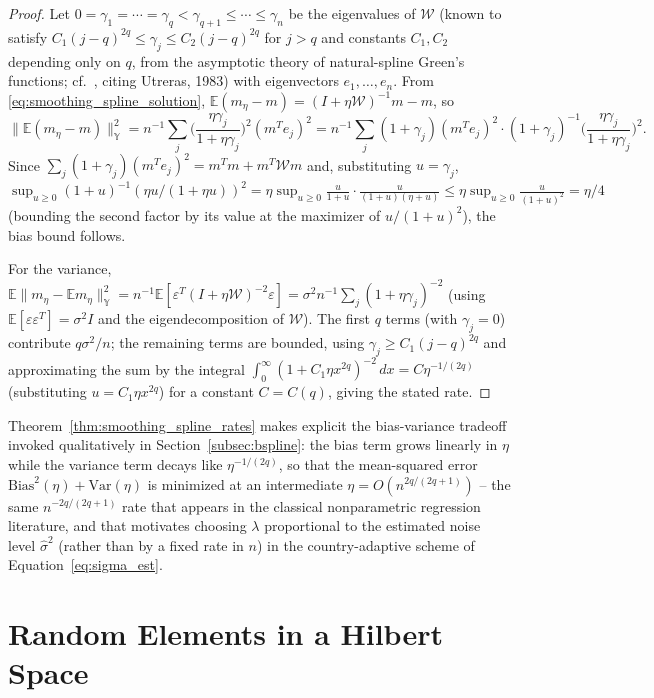 \begin{proof}
Let $0=\gamma_1=\cdots=\gamma_q<\gamma_{q+1}\leq\cdots\leq\gamma_n$ be the
eigenvalues of $\mathcal{W}$ (known to satisfy $C_1(j-q)^{2q}\leq\gamma_j
\leq C_2(j-q)^{2q}$ for $j>q$ and constants $C_1,C_2$ depending only on
$q$, from the asymptotic theory of natural-spline Green's functions; cf.\
\cite{hsingeubank2015}, citing Utreras, 1983) with eigenvectors
$e_1,\dots,e_n$. From \eqref{eq:smoothing_spline_solution}, $\mathbb{E}
(m_\eta-m) = (I+\eta\mathcal{W})^{-1}m-m$, so
\[
\|\mathbb{E}(m_\eta-m)\|_{\mathbb{Y}}^2 = n^{-1}\sum_j\Big(\frac{\eta
\gamma_j}{1+\eta\gamma_j}\Big)^2(m^Te_j)^2 = n^{-1}\sum_j(1+\gamma_j)(m^T
e_j)^2\cdot(1+\gamma_j)^{-1}\Big(\frac{\eta\gamma_j}{1+\eta\gamma_j}\Big)^2.
\]
Since $\sum_j(1+\gamma_j)(m^Te_j)^2=m^Tm+m^T\mathcal{W}m$ and, substituting
$u=\gamma_j$, $\sup_{u\geq 0}(1+u)^{-1}(\eta u/(1+\eta u))^2 = \eta\sup_
{u\geq 0}\frac{u}{1+u}\cdot\frac{u}{(1+u)(\eta+u)} \le \eta\sup_{u\geq 0}
\frac{u}{(1+u)^2}=\eta/4$ (bounding the second factor by its value at the
maximizer of $u/(1+u)^2$), the bias bound follows.

For the variance, $\mathbb{E}\|m_\eta-\mathbb{E}m_\eta\|_{\mathbb{Y}}^2 =
n^{-1}\mathbb{E}[\varepsilon^T(I+\eta\mathcal{W})^{-2}\varepsilon] =
\sigma^2n^{-1}\sum_j(1+\eta\gamma_j)^{-2}$ (using $\mathbb{E}[\varepsilon
\varepsilon^T]=\sigma^2I$ and the eigendecomposition of $\mathcal{W}$).
The first $q$ terms (with $\gamma_j=0$) contribute $q\sigma^2/n$; the
remaining terms are bounded, using $\gamma_j\geq C_1(j-q)^{2q}$ and
approximating the sum by the integral $\int_0^\infty(1+C_1\eta x^{2q})^{
-2}\,dx = C\eta^{-1/(2q)}$ (substituting $u=C_1\eta x^{2q}$) for a constant
$C=C(q)$, giving the stated rate.
\end{proof}

Theorem~\ref{thm:smoothing_spline_rates} makes explicit the bias-variance
tradeoff invoked qualitatively in Section~\ref{subsec:bspline}: the bias
term grows linearly in $\eta$ while the variance term decays like
$\eta^{-1/(2q)}$, so that the mean-squared error $\mathrm{Bias}^2(\eta)+
\mathrm{Var}(\eta)$ is minimized at an intermediate $\eta=O(n^{2q/(2q+1)})$
-- the same $n^{-2q/(2q+1)}$ rate that appears in the classical
nonparametric regression literature, and that motivates choosing $\lambda$
proportional to the estimated noise level $\widehat\sigma^2$ (rather than
by a fixed rate in $n$) in the country-adaptive scheme of
Equation~\eqref{eq:sigma_est}.

\section{Random Elements in a Hilbert Space}
\label{sec:random_elements}


